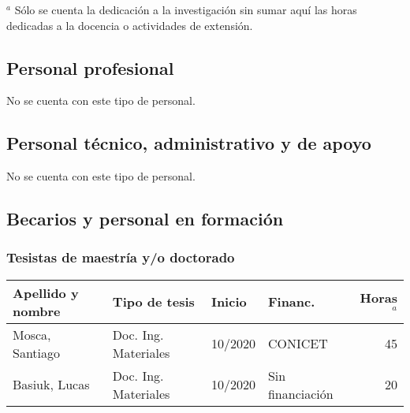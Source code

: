 \documentclass[a4paper,11pt,twoside,final,titlepage,onecolumn,openright]{report}
\begin{document}
\normalsize
\vspace{0.5cm}
$^a$ Sólo se cuenta la dedicación a la investigación sin sumar aquí las horas dedicadas a la docencia o actividades de extensión.


\subsection{Personal profesional}
No se cuenta con este tipo de personal.



\subsection{Personal técnico, administrativo y de apoyo}
No se cuenta con este tipo de personal.


\subsection{Becarios y personal en formación}

\subsubsection{Tesistas de maestría y/o doctorado}
\begin{tabular}{l l l l r}
\toprule
Apellido y nombre & Tipo de tesis & Inicio & Financ. & Horas$^a$ \\
\midrule
Mosca, Santiago & Doc. Ing. Materiales & 10/2020 &  CONICET & 45\\
Basiuk, Lucas & Doc. Ing. Materiales & 10/2020 &  Sin financiación & 20\\
\bottomrule
\end{tabular}
\end{document}
